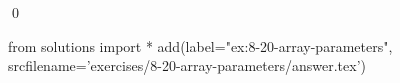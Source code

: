 
\begin{ex}
  \label{ex:8-20-array-parameters}
  
  \qed
\end{ex}
\begin{python0}
from solutions import *
add(label="ex:8-20-array-parameters",
    srcfilename='exercises/8-20-array-parameters/answer.tex')
\end{python0}
